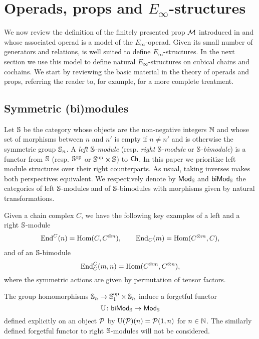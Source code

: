 
\section{Operads, props and \texorpdfstring{${E_\infty}$}{E-infty}-structures} \label{s:operads and props}

We now review the definition of the finitely presented prop $\mathcal{M}$ introduced in \cite{medina2020prop1} and whose associated operad is a model of the $E_\infty$-operad.
Given its small number of generators and relations, is well suited to define $E_\infty$-structures.
In the next section we use this model to define natural $E_\infty$-structures on cubical chains and cochains.
We start by reviewing the basic material in the theory of operads and props, referring the reader to, for example, \cite{markl2008props} for a more complete treatment.

\subsection{Symmetric (bi)modules}

Let $\mathbb{S}$ be the category whose objects are the non-negative integers $\mathbb{N}$ and whose set of morphisms between $n$ and $n'$ is empty if $n \neq n'$ and is otherwise the symmetric group $\mathbb{S}_n$.
A \textit{left $\mathbb{S}$-module} (resp. \textit{right} $\mathbb{S}$-\textit{module} or $\mathbb{S}$-\textit{bimodule}) is a functor from $\mathbb{S}$ (resp. $\mathbb{S}^{\mathrm{op}}$ or $\mathbb{S}^{\mathrm{op}} \times \mathbb{S}$) to $\mathsf{Ch}$.
In this paper we prioritize left module structures over their right counterparts.
As usual, taking inverses makes both perspectives equivalent.
We respectively denote by $\mathsf{Mod}_{\mathbb{S}}$ and $\mathsf{biMod}_{\mathbb{S}}$ the categories of left $\mathbb{S}$-modules and of $\mathbb{S}$-bimodules with morphisms given by natural transformations.

Given a chain complex $C$, we have the following key examples of a left and a right $\mathbb{S}$-module
\begin{gather*}
	\mathrm{End}^C(n) = \mathrm{Hom}(C, C^{\otimes n}), \qquad
	\mathrm{End}_C(m) = \mathrm{Hom}(C^{\otimes m}, C),
\end{gather*}
and of an $\mathbb{S}$-bimodule
\[
\mathrm{End}^C_C(m,n) = \mathrm{Hom}(C^{\otimes m}, C^{\otimes n}),
\]
where the symmetric actions are given by permutation of tensor factors.

The group homomorphisms $\mathbb{S}_n \to \mathbb{S}_1^{\mathrm{op}} \times \mathbb{S}_n$ induce a forgetful functor
\begin{equation} \label{e:forgetful}
	\operatorname{U} \colon \mathsf{biMod}_{\mathbb{S}} \to \mathsf{Mod}_{\mathbb{S}}
\end{equation}
defined explicitly on an object $\mathcal{P}$ by $\operatorname{U}(\mathcal{P})(n) = \mathcal{P}(1, n)$ for $n \in \mathbb{N}$.
The similarly defined forgetful functor to right $\mathbb{S}$-modules will not be considered.

